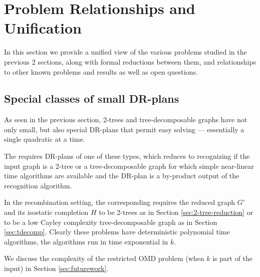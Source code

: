 \section{Problem Relationships and Unification}
\label{sec:table}
In this section we provide a unified view of  the various problems
studied in the previous 2 sections, along with formal reductions
between them, and relationships to other known problems and results as
well as open questions.
%
\subsection{Special classes of small DR-plans}
As seen in the previous section, 2-trees and tree-decomposable graphs
have not only small, but also special DR-plans that permit easy
solving --- essentially a single quadratic at a time.

The  requires DR-plans of
one of these types, which reduces to recognizing if the input graph is
a 2-tree or a tree-decomposable graph for which simple near-linear
time algorithms are available \cite{valdes1979recognition,fudos1997graph} and the DR-plan is a
by-product output of the recognition algorithm.

In the recombination setting, the corresponding  requires the reduced graph $G'$ and its isostatic
completion $H$ to be 2-trees as in Section \ref{sec:2-tree-reduction}
or to be a low Cayley complexity tree-decomposable graph as in Section
\ref{sec:tdecomp}. Clearly these problems have deterministic
polynomial time algorithms, the algorithms run in time exponential in
$k$.

We discuss the complexity of the restricted
OMD problem (when $k$ is part of the input)
in Section \ref{sec:futurework}.


